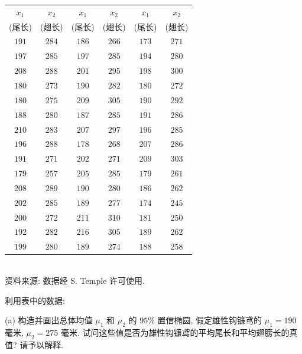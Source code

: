 \begin{mvtable}
\label{tab:5.12}
\centering
{\small
\begin{tabular}{|c|c|c|c|c|c|}
\hline
$x_{1}$ & $x_{2}$ & $x_{1}$ & $x_{2}$ & $x_{1}$ & $x_{2}$\\
(尾长) & (翅长) & (尾长) & (翅长) & (尾长) & (翅长)\\
\hline
$191$ & $284$ & $186$ & $266$ & $173$ & $271$\\
$197$ & $285$ & $197$ & $285$ & $194$ & $280$\\
$208$ & $288$ & $201$ & $295$ & $198$ & $300$\\
$180$ & $273$ & $190$ & $282$ & $180$ & $272$\\
$180$ & $275$ & $209$ & $305$ & $190$ & $292$\\
$188$ & $280$ & $187$ & $285$ & $191$ & $286$\\
$210$ & $283$ & $207$ & $297$ & $196$ & $285$\\
$196$ & $288$ & $178$ & $268$ & $207$ & $286$\\
$191$ & $271$ & $202$ & $271$ & $209$ & $303$\\
$179$ & $257$ & $205$ & $285$ & $179$ & $261$\\
$208$ & $289$ & $190$ & $280$ & $186$ & $262$\\
$202$ & $285$ & $189$ & $277$ & $174$ & $245$\\
$200$ & $272$ & $211$ & $310$ & $181$ & $250$\\
$192$ & $282$ & $216$ & $305$ & $189$ & $262$\\
$199$ & $280$ & $189$ & $274$ & $188$ & $258$\\
\hline
\end{tabular}}\\[3pt]
{\footnotesize 资料来源: 数据经 S. Temple 许可使用.}
\end{mvtable}

利用表中的数据:

\noindent (a) 构造并画出总体均值 $\mu_{1}$ 和 $\mu_{2}$ 的 $95\%$ 置信椭圆, 假定雄性钩镰鸢的 $\mu_{1}=190$ 毫米, $\mu_{2}=275$ 毫米. 试问这些值是否为雄性钩镰鸢的平均尾长和平均翅膀长的真值? 请予以解释.
